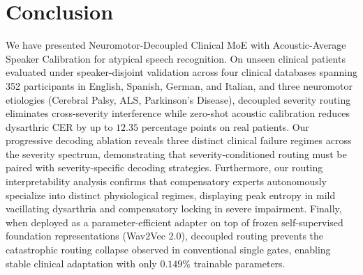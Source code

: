 \documentclass[10pt,twocolumn]{article}
\begin{document}
\section{Conclusion}

We have presented Neuromotor-Decoupled Clinical MoE with Acoustic-Average Speaker Calibration for atypical speech recognition. On unseen clinical patients evaluated under speaker-disjoint validation across four clinical databases spanning 352 participants in English, Spanish, German, and Italian, and three neuromotor etiologies (Cerebral Palsy, ALS, Parkinson's Disease), decoupled severity routing eliminates cross-severity interference while zero-shot acoustic calibration reduces dysarthric CER by up to $12.35$ percentage points on real patients. Our progressive decoding ablation reveals three distinct clinical failure regimes across the severity spectrum, demonstrating that severity-conditioned routing must be paired with severity-specific decoding strategies. Furthermore, our routing interpretability analysis confirms that compensatory experts autonomously specialize into distinct physiological regimes, displaying peak entropy in mild vacillating dysarthria and compensatory locking in severe impairment. Finally, when deployed as a parameter-efficient adapter on top of frozen self-supervised foundation representations (Wav2Vec 2.0), decoupled routing prevents the catastrophic routing collapse observed in conventional single gates, enabling stable clinical adaptation with only $0.149\%$ trainable parameters.



\end{document}
